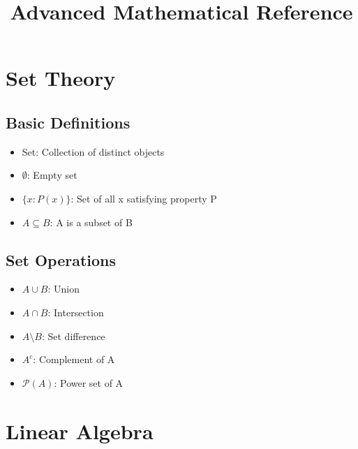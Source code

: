 \documentclass[10pt,a4paper,twocolumn]{article}
\begin{document}
\title{\textbf{Advanced Mathematical Reference}}
\author{}
\date{}
\maketitle

\tableofcontents

\section{Set Theory}

\subsection{Basic Definitions}
\begin{itemize}[leftmargin=*]
\item Set: Collection of distinct objects
\item $\emptyset$: Empty set
\item $\{x : P(x)\}$: Set of all x satisfying property P
\item $A \subseteq B$: A is a subset of B
\end{itemize}

\subsection{Set Operations}
\begin{itemize}[leftmargin=*]
\item $A \cup B$: Union
\item $A \cap B$: Intersection
\item $A \setminus B$: Set difference
\item $A^c$: Complement of A
\item $\mathcal{P}(A)$: Power set of A
\end{itemize}

\section{Linear Algebra}
\end{document}
